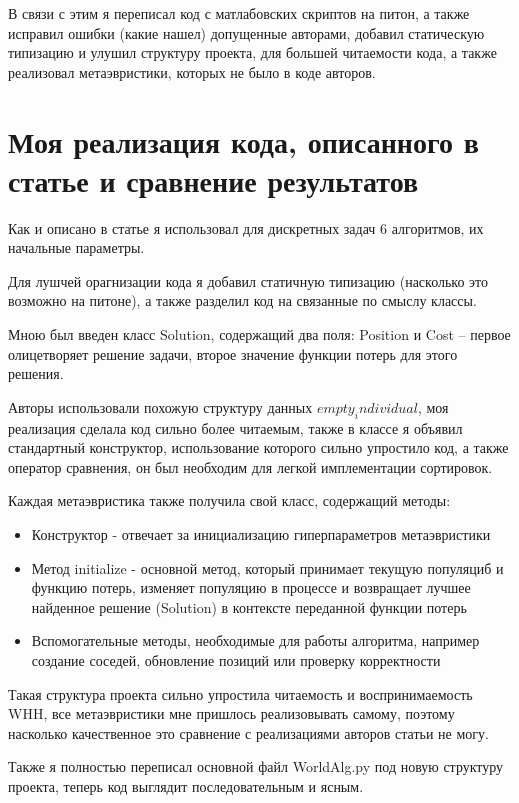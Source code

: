 \documentclass[a4paper,12pt]{extarticle}
\begin{document}
В связи с этим я переписал код с матлабовских скриптов на питон, а также исправил ошибки (какие нашел) допущенные авторами, добавил статическую типизацию и улушил структуру проекта, для большей читаемости кода, а также реализовал метаэвристики, которых не было в коде авторов.

\section{Моя реализация кода, описанного в статье и сравнение результатов}

Как и описано в статье я использовал для дискретных задач 6 алгоритмов, их начальные параметры.

Для лушчей орагнизации кода я добавил статичную типизацию (насколько это возможно на питоне), а также разделил код на связанные по смыслу классы.

Мною был введен класс Solution, содержащий два поля: Position и Cost -- первое олицетворяет решение задачи, второе значение функции потерь для этого решения.

Авторы использовали похожую структуру данных $empty_individual$, моя реализация сделала код сильно более читаемым, также в классе я объявил стандартный конструктор, использование которого сильно упростило код, а также оператор сравнения, он был необходим для легкой имплементации сортировок.

Каждая метаэвристика также получила свой класс, содержащий методы:

\begin{itemize}
	\item Конструктор - отвечает за инициализацию гиперпараметров метаэвристики
	\item Метод initialize - основной метод, который принимает текущую популяциб и функцию потерь, изменяет популяцию в процессе и возвращает лучшее найденное решение (Solution) в контексте переданной функции потерь
	\item Вспомогательные методы, необходимые для работы алгоритма, например создание соседей, обновление позиций или проверку корректности
\end{itemize}

Такая структура проекта сильно упростила читаемость и воспринимаемость WHH, все метаэвристики мне пришлось реализовывать самому, поэтому насколько качественное это сравнение с реализациями авторов статьи не могу.

Также я полностью переписал основной файл WorldAlg.py под новую структуру проекта, теперь код выглядит последовательным и ясным.
\end{document}
